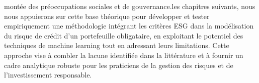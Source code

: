 montée des préoccupations sociales et de gouvernance.\n\nDans les chapitres suivants, nous nous appuierons sur cette base théorique pour développer et tester empiriquement une méthodologie intégrant les critères ESG dans la modélisation du risque de crédit d'un portefeuille obligataire, en exploitant le potentiel des techniques de machine learning tout en adressant leurs limitations. Cette approche vise à combler la lacune identifiée dans la littérature et à fournir un cadre analytique robuste pour les praticiens de la gestion des risques et de l'investissement responsable.